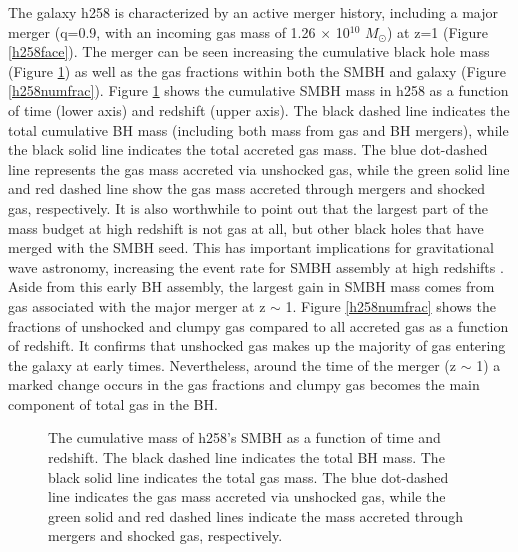 \documentclass[12pt,headA,chapB]{fiskthesis}
\begin{document}
The galaxy h258 is characterized by an active merger history, including a major merger (q=0.9, with an incoming gas mass of 1.26 $\times$ 10$^{10}$ $M_{\odot}$) at z=1 (Figure \ref{h258face}). The merger can be seen increasing the cumulative black hole mass (Figure \ref{h258allmassgas}) as well as the gas fractions within both the SMBH and galaxy (Figure \ref{h258numfrac}). Figure \ref{h258allmassgas} shows the cumulative SMBH mass in h258 as a function of time (lower axis) and redshift (upper axis). The black dashed line indicates the total cumulative BH mass (including both mass from gas and BH mergers), while the black solid line indicates the total accreted gas mass. The blue dot-dashed line represents the gas mass accreted via unshocked gas, while the green solid line and red dashed line show the gas mass accreted through mergers and shocked gas, respectively. It is also worthwhile to point out that the largest part of the mass budget at high redshift is not gas at all, but other black holes that have merged with the SMBH seed. This has important implications for gravitational wave astronomy, increasing the event rate for SMBH assembly at high redshifts \citep{Holley-Bockelmann2010}. Aside from this early BH assembly, the largest gain in SMBH mass comes from gas associated with the major merger at z $\sim$ 1. Figure \ref{h258numfrac} shows the fractions of unshocked and clumpy gas compared to all accreted gas as a function of redshift. It confirms that unshocked gas makes up the majority of gas entering the galaxy at early times. Nevertheless, around the time of the merger (z $\sim$ 1) a marked change occurs in the gas fractions and clumpy gas becomes the main component of total gas in the BH.

\begin{figure}
\centerline{}
\caption[GASOLINE h258 SMBH Cumulative Mass]{The cumulative mass of h258's SMBH as a function of time and redshift. The black dashed line indicates the total BH mass. The black solid line indicates the total gas mass. The blue dot-dashed line indicates the gas mass accreted via unshocked gas, while the green solid and red dashed lines indicate the mass accreted through mergers and shocked gas, respectively.}
\label{h258allmassgas} 
\end{figure}
\end{document}
